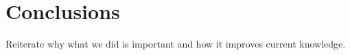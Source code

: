 \section{Conclusions}

Reiterate why what we did is important and how it improves current knowledge.
